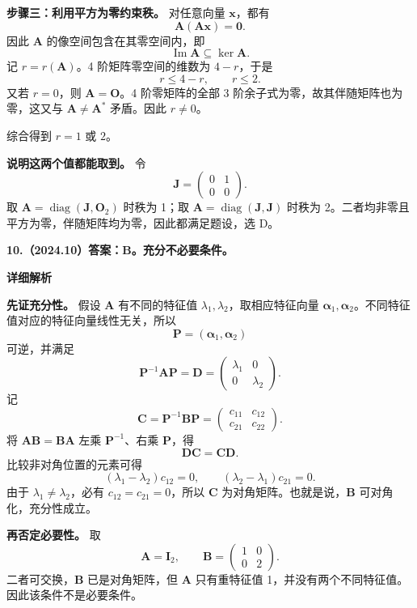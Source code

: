 \documentclass[UTF8,11pt,fontset=windows]{ctexart}
\begin{document}
\textbf{步骤三：利用平方为零约束秩。} 对任意向量 $\boldsymbol x$，都有
$$
\boldsymbol A(\boldsymbol A\boldsymbol x)=\boldsymbol0.
$$
因此 $\boldsymbol A$ 的像空间包含在其零空间内，即
$$
\operatorname{Im}\boldsymbol A\subseteq\ker\boldsymbol A.
$$
记 $r=r(\boldsymbol A)$。4 阶矩阵零空间的维数为 $4-r$，于是
$$
r\le4-r,\qquad r\le2.
$$
又若 $r=0$，则 $\boldsymbol A=\boldsymbol O$。4 阶零矩阵的全部 3 阶余子式为零，故其伴随矩阵也为零，这又与 $\boldsymbol A\ne\boldsymbol A^*$ 矛盾。因此 $r\ne0$。

综合得到 $r=1$ 或 $2$。

\textbf{说明这两个值都能取到。} 令
$$
\boldsymbol J=\begin{pmatrix}0&1\\0&0\end{pmatrix}.
$$
取 $\boldsymbol A=\operatorname{diag}(\boldsymbol J,\boldsymbol O_2)$ 时秩为 1；取 $\boldsymbol A=\operatorname{diag}(\boldsymbol J,\boldsymbol J)$ 时秩为 2。二者均非零且平方为零，伴随矩阵均为零，因此都满足题设，选 D。

\clearpage

\textbf{10.（2024.10）答案：B。充分不必要条件。}

\textbf{详细解析}

\textbf{先证充分性。} 假设 $\boldsymbol A$ 有不同的特征值 $\lambda_1,\lambda_2$，取相应特征向量 $\boldsymbol\alpha_1,\boldsymbol\alpha_2$。不同特征值对应的特征向量线性无关，所以
$$
\boldsymbol P=(\boldsymbol\alpha_1,\boldsymbol\alpha_2)
$$
可逆，并满足
$$
\boldsymbol P^{-1}\boldsymbol A\boldsymbol P
=\boldsymbol D=\begin{pmatrix}\lambda_1&0\\0&\lambda_2\end{pmatrix}.
$$
记
$$
\boldsymbol C=\boldsymbol P^{-1}\boldsymbol B\boldsymbol P
=\begin{pmatrix}c_{11}&c_{12}\\c_{21}&c_{22}\end{pmatrix}.
$$
将 $\boldsymbol A\boldsymbol B=\boldsymbol B\boldsymbol A$ 左乘 $\boldsymbol P^{-1}$、右乘 $\boldsymbol P$，得
$$
\boldsymbol D\boldsymbol C=\boldsymbol C\boldsymbol D.
$$
比较非对角位置的元素可得
$$
(\lambda_1-\lambda_2)c_{12}=0,
\qquad
(\lambda_2-\lambda_1)c_{21}=0.
$$
由于 $\lambda_1\ne\lambda_2$，必有 $c_{12}=c_{21}=0$，所以 $\boldsymbol C$ 为对角矩阵。也就是说，$\boldsymbol B$ 可对角化，充分性成立。

\textbf{再否定必要性。} 取
$$
\boldsymbol A=\boldsymbol I_2,
\qquad
\boldsymbol B=\begin{pmatrix}1&0\\0&2\end{pmatrix}.
$$
二者可交换，$\boldsymbol B$ 已是对角矩阵，但 $\boldsymbol A$ 只有重特征值 1，并没有两个不同特征值。因此该条件不是必要条件。
\end{document}
